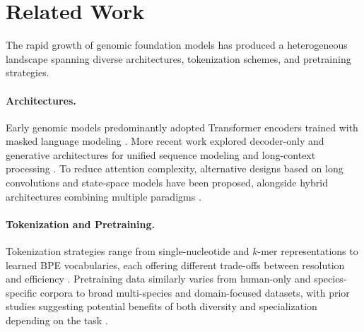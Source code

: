 \documentclass{llmxive}
\begin{document}
\section{Related Work}


The rapid growth of genomic foundation models has produced a 
heterogeneous landscape spanning diverse architectures, tokenization 
schemes, and pretraining strategies.

\paragraph{Architectures.}
Early genomic models predominantly adopted Transformer encoders trained with masked language modeling \citep{zhou2024dnabert2efficientfoundationmodel,dalla2023nucleotide,GENA_LM,sanabria2024grover}. More recent work explored decoder-only and generative architectures for unified sequence modeling and long-context processing \citep{zhang2023dnagptgeneralizedpretrainedtool,nguyen2024sequence,wu2025generatorlongcontextgenerativegenomic,Zhou2025.01.30.635558,li2025omnidnaunifiedgenomicfoundation}. To reduce attention complexity, alternative designs based on long convolutions and state-space models have been proposed, alongside hybrid architectures combining multiple paradigms \citep{nguyen2023hyenadnalongrangegenomicsequence,schiff2024caduceusbidirectionalequivariantlongrange,liu2025eccdnamambapretrainedmodelultralong,duan2025janusdnapowerfulbidirectionalhybrid,vishniakov2025gene42longrangegenomicfoundation}.

\paragraph{Tokenization and Pretraining.}
Tokenization strategies range from single-nucleotide and $k$-mer representations to learned BPE vocabularies, each offering different trade-offs between resolution and efficiency \citep{zhou2024dnabert2efficientfoundationmodel,Zhou2025.01.30.635558}. Pretraining data similarly varies from human-only and species-specific corpora to broad multi-species and domain-focused datasets, with prior studies suggesting potential benefits of both diversity and specialization depending on the task \citep{dalla2023nucleotide,wu2025generatorlongcontextgenerativegenomic,avsec2021enformer,doi:10.1073/pnas.2421738122}.
\end{document}
